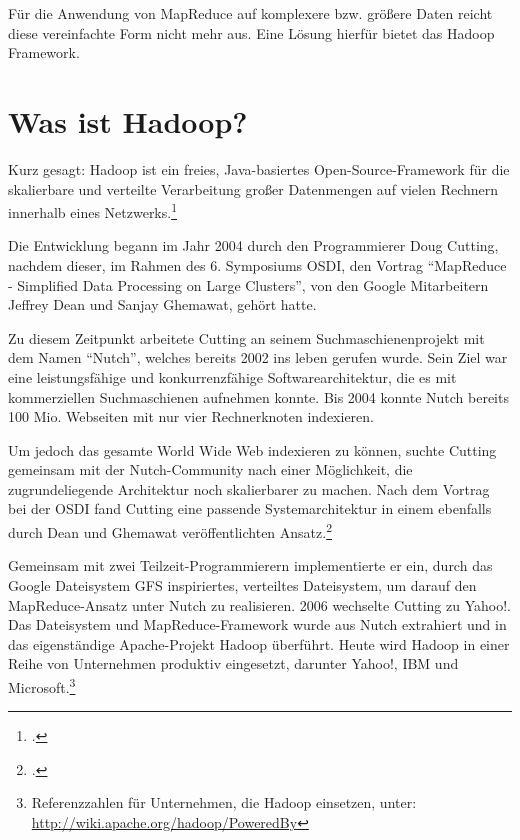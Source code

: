 Für die Anwendung von MapReduce auf komplexere bzw. größere Daten reicht diese vereinfachte Form nicht mehr aus. Eine Lösung hierfür bietet das Hadoop Framework.



\section{Was ist Hadoop?}\label{sec:WasIstHadoop}
\flqq Kurz gesagt: Hadoop ist ein freies, Java-basiertes Open-Source-Framework für die skalierbare und verteilte Verarbeitung großer Datenmengen auf vielen Rechnern innerhalb eines Netzwerks.\frqq\footcite[S. 21]{Wartala.2012}

Die Entwicklung begann im Jahr 2004 durch den Programmierer Doug Cutting, nachdem dieser, im Rahmen des 6. Symposiums \ac{OSDI}, den Vortrag "`MapReduce - Simplified Data Processing on Large Clusters"', von den Google Mitarbeitern Jeffrey Dean und Sanjay Ghemawat, gehört hatte.

Zu diesem Zeitpunkt arbeitete Cutting an seinem Suchmaschienenprojekt mit dem Namen "`Nutch"', welches bereits 2002 ins leben gerufen wurde. Sein Ziel war eine leistungsfähige und konkurrenzfähige Softwarearchitektur, die es mit kommerziellen Suchmaschienen aufnehmen konnte. Bis 2004 konnte Nutch bereits 100 Mio. Webseiten mit nur vier Rechnerknoten indexieren.

Um jedoch das gesamte World Wide Web indexieren zu können, suchte Cutting gemeinsam mit der Nutch-Community nach einer Möglichkeit, die zugrundeliegende Architektur noch skalierbarer zu machen. Nach dem Vortrag bei der \ac{OSDI} fand Cutting eine passende Systemarchitektur in einem ebenfalls durch Dean und Ghemawat veröffentlichten Ansatz.\footcite[Näheres siehe][]{Dean.2004}

Gemeinsam mit zwei Teilzeit-Programmierern implementierte er ein, durch das Google Dateisystem \ac{GFS} inspiriertes, verteiltes Dateisystem, um darauf den MapReduce-Ansatz unter Nutch zu realisieren. 2006 wechselte Cutting zu Yahoo!. Das Dateisystem und MapReduce-Framework wurde aus Nutch extrahiert und in das eigenständige Apache-Projekt Hadoop überführt. Heute wird Hadoop in einer Reihe von Unternehmen produktiv eingesetzt, darunter Yahoo!, IBM und Microsoft.\footnote{Referenzzahlen für Unternehmen, die Hadoop einsetzen, unter:\\ \url{http://wiki.apache.org/hadoop/PoweredBy}}

